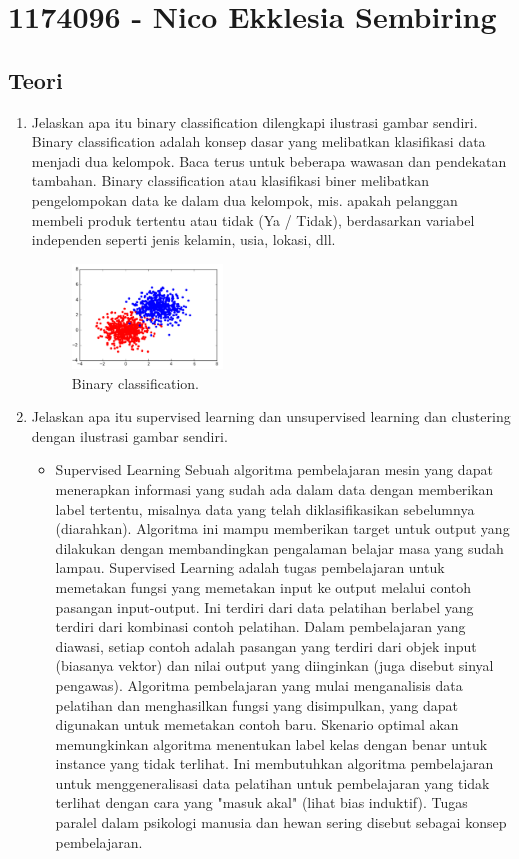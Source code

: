 \section{1174096 - Nico Ekklesia Sembiring}
\subsection{Teori}
\begin{enumerate}

	\item Jelaskan apa itu binary classification dilengkapi ilustrasi gambar sendiri.
	\hfill\break
	Binary classification adalah konsep dasar yang melibatkan klasifikasi data menjadi dua kelompok. Baca terus untuk beberapa wawasan dan pendekatan tambahan. Binary classification atau klasifikasi biner melibatkan pengelompokan data ke dalam dua kelompok, mis. apakah pelanggan membeli produk tertentu atau tidak (Ya / Tidak), berdasarkan variabel independen seperti jenis kelamin, usia, lokasi, dll.

	\begin{figure}[H]
	\centering
		\includegraphics[width=4cm]{figures/1174096/tugas2/2/1.png}
		\caption{Binary classification.}
	\end{figure}

	\item Jelaskan apa itu supervised learning dan unsupervised learning dan clustering dengan ilustrasi gambar sendiri.
	\hfill\break

	\begin{itemize}
		\item Supervised Learning
		\hfill\break
		Sebuah algoritma pembelajaran mesin yang dapat menerapkan informasi yang sudah ada dalam data dengan memberikan label tertentu, misalnya data yang telah diklasifikasikan sebelumnya (diarahkan). Algoritma ini mampu memberikan target untuk output yang dilakukan dengan membandingkan pengalaman belajar masa yang sudah lampau. Supervised Learning adalah tugas pembelajaran untuk memetakan fungsi yang memetakan input ke output melalui contoh pasangan input-output. Ini terdiri dari data pelatihan berlabel yang terdiri dari kombinasi contoh pelatihan. Dalam pembelajaran yang diawasi, setiap contoh adalah pasangan yang terdiri dari objek input (biasanya vektor) dan nilai output yang diinginkan (juga disebut sinyal pengawas). Algoritma pembelajaran yang mulai menganalisis data pelatihan dan menghasilkan fungsi yang disimpulkan, yang dapat digunakan untuk memetakan contoh baru. Skenario optimal akan memungkinkan algoritma menentukan label kelas dengan benar untuk instance yang tidak terlihat. Ini membutuhkan algoritma pembelajaran untuk menggeneralisasi data pelatihan untuk pembelajaran yang tidak terlihat dengan cara yang "masuk akal" (lihat bias induktif). Tugas paralel dalam psikologi manusia dan hewan sering disebut sebagai konsep pembelajaran.


\end{itemize}
\end{enumerate}
